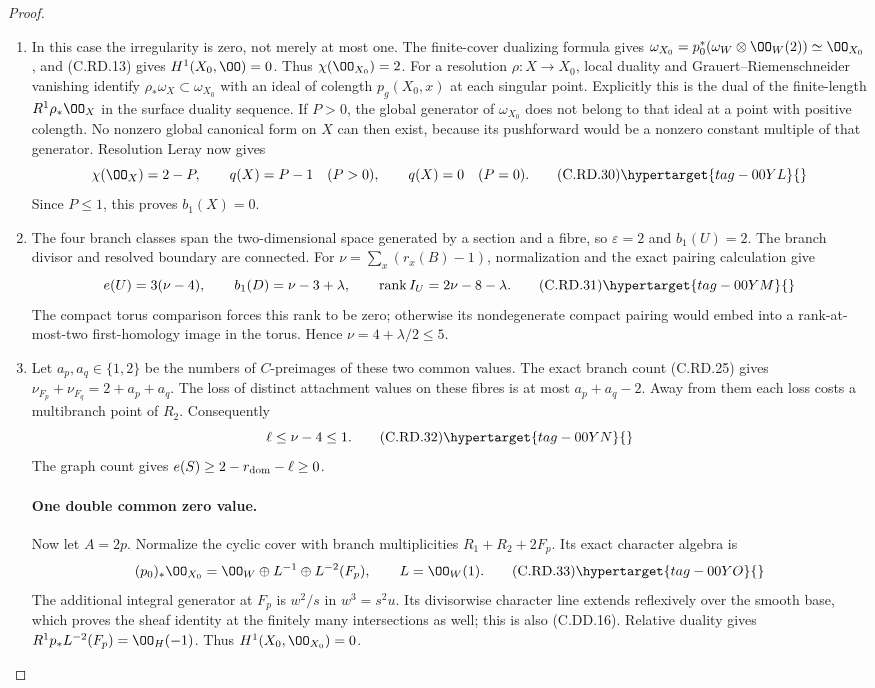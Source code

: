 \begin{proof}
\begin{enumerate}[label={$\langle1\rangle$\arabic*.},leftmargin=*]
\item In this case the irregularity is zero, not
merely at most one. The finite-cover dualizing
formula gives
$\omega_{X_0}=p_0^*(\omega_W\otimes\OO_W(2))
\simeq\OO_{X_0}$, and (C.RD.13) gives
$H^1(X_0,\OO)=0$. Thus $\chi(\OO_{X_0})=2$.
For a resolution $\rho:X\to X_0$, local duality
and Grauert--Riemenschneider vanishing identify
$\rho_*\omega_X\subset\omega_{X_0}$ with an
ideal of colength $p_g(X_0,x)$ at each singular
point. Explicitly this is the dual of the
finite-length $R^1\rho_*\OO_X$ in the surface
duality sequence. If $P>0$, the global generator
of $\omega_{X_0}$ does not belong to that ideal
at a point with positive colength. No nonzero
global canonical form on $X$ can then exist,
because its pushforward would be a nonzero
constant multiple of that generator.
Resolution Leray now gives
\[
 \chi(\OO_X)=2-P,
 \qquad q(X)=P-1\quad(P>0),
 \qquad q(X)=0\quad(P=0).
\tag{C.RD.30}\hypertarget{tag-00YL}{}\label{cdp:eq:C.RD.30}
\]
Since $P\le1$, this proves $b_1(X)=0$.

\item The four branch classes span the two-dimensional
space generated by a section and a fibre, so
$\varepsilon=2$ and $b_1(U)=2$.
The branch divisor and resolved boundary are
connected. For
$\nu=\sum_x(r_x(B)-1)$, normalization and the
exact pairing calculation give
\[
 e(U)=3(\nu-4),\qquad b_1(D)=\nu-3+\lambda,
 \qquad \operatorname{rank}I_U=2\nu-8-\lambda.
\tag{C.RD.31}\hypertarget{tag-00YM}{}\label{cdp:eq:C.RD.31}
\]
The compact torus comparison forces this rank
to be zero; otherwise its nondegenerate compact
pairing would embed into a rank-at-most-two
first-homology image in the torus. Hence
$\nu=4+\lambda/2\le5$.

\item Let $a_p,a_q\in\{1,2\}$ be the numbers of
$C$-preimages of these two common values.
The exact branch count (C.RD.25) gives
$\nu_{F_p}+\nu_{F_q}=2+a_p+a_q$.
The loss of distinct attachment values on
these fibres is at most $a_p+a_q-2$.
Away from them each loss costs a multibranch
point of $R_2$. Consequently
\[
                    \ell\le\nu-4\le1.
\tag{C.RD.32}\hypertarget{tag-00YN}{}\label{cdp:eq:C.RD.32}
\]
The graph count gives
$e(S)\ge2-r_{\rm dom}-\ell\ge0$.

\paragraph{One double common zero value.}
Now let $A=2p$. Normalize the cyclic cover
with branch multiplicities $R_1+R_2+2F_p$.
Its exact character algebra is
\[
 (p_0)_*\OO_{X_0}
       =\OO_W\oplus L^{-1}\oplus L^{-2}(F_p),
                  \qquad L=\OO_W(1).
\tag{C.RD.33}\hypertarget{tag-00YO}{}\label{cdp:eq:C.RD.33}
\]
The additional integral generator at $F_p$
is $w^2/s$ in $w^3=s^2u$. Its divisorwise
character line extends reflexively over the
smooth base, which proves the sheaf identity
at the finitely many intersections as well;
this is also (C.DD.16). Relative duality gives
$R^1p_*L^{-2}(F_p)=\OO_H(-1)$.
Thus $H^1(X_0,\OO_{X_0})=0$.


\end{enumerate}
\end{proof}
